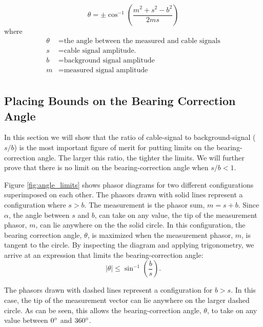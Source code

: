 \documentclass[paper=a4, fontsize=11pt]{scrartcl}
\numberwithin{equation}{section}		%
\numberwithin{figure}{section}			%
\numberwithin{table}{section}				%
\begin{document}
\begin{appendices}
\begin{equation} \label{eq:theta_solution}
\theta = \pm \cos^{-1}\left(\frac{m^2 + s^2 - b^2}{2ms}\right)
\end{equation}
where
\begin{align*}
        \theta &= \text{the angle between the measured and cable signals}\\
        s &= \text{cable signal amplitude.}\\
        b &= \text{background signal amplitude} \\
        m &= \text{measured signal amplitude} \\
\end{align*}


\subsection{Placing Bounds on the Bearing Correction Angle}\label{section:angle_bounds}
In this section we will show that the ratio of cable-signal to background-signal ($s/b$) is the most important figure of merit for putting limits on the bearing-correction angle. The larger this ratio, the tighter the limits. We will further prove that there is no limit on the bearing-correction angle when $s/b < 1$.




Figure \ref{fig:angle_limits} shows phasor diagrams for two different configurations superimposed on each other.  The phasors drawn with solid lines represent a configuration where $s>b$.  The measurement is the phasor sum, $m=s+b$.  Since $\alpha$, the angle between $s$ and $b$, can take on any value, the tip of the measurement phasor,  $m$, can lie anywhere on the the solid circle.  In this configuration, the bearing correction angle, $\theta$, is maximized when the measurement phasor, $m$, is tangent to the circle.  By inspecting the diagram and applying trigonometry, we arrive at an expression that limits the bearing-correction angle: 
\begin{equation} \label{eq:angle_limits}
    \left| \theta \right| \leq \sin^{-1}\left(\frac{b}{s}\right).
\end{equation}

The phasors drawn with dashed lines represent a configuration for $b > s$.  In this case, the tip of the measurement vector can lie anywhere on the larger dashed circle.  As can be seen, this allows the bearing-correction angle, $\theta$, to take on any value between $0\degree$ and $360\degree$.


\end{appendices}
\end{document}
